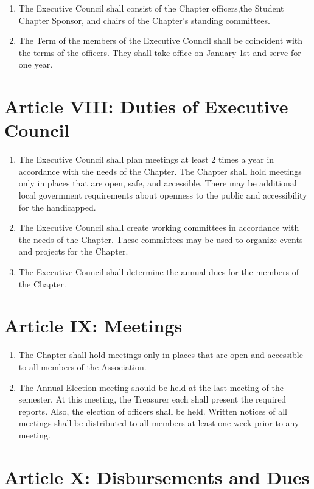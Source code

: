 \begin{enumerate}
	\item The Executive Council shall consist of the Chapter officers,the Student Chapter Sponsor, and chairs of the Chapter's standing committees.
	\item The Term of the members of the Executive Council shall be coincident with the terms of the officers. They shall take office on January 1st and serve for one year.
\end{enumerate}


\section*{Article VIII: Duties of Executive Council}

\begin{enumerate}
	\item The Executive Council shall plan meetings at least 2 times a year in accordance with the needs of the Chapter. The Chapter shall hold meetings only in places that are open, safe, and accessible. There may be additional local government requirements about openness to the public and accessibility for the handicapped.
	\item The Executive Council shall create working committees in accordance with the needs of the Chapter. These committees may be used to organize events and projects for the Chapter.
	\item The Executive Council shall determine the annual dues for the members of the Chapter.
\end{enumerate}

\section*{Article IX: Meetings}

\begin{enumerate}
	\item The Chapter shall hold meetings only in places that are open and accessible to all members of the Association.
	\item The Annual Election meeting should be held at the last meeting of the semester. At this meeting, the Treasurer each shall present the required reports. Also, the election of officers shall be held. Written notices of all meetings shall be distributed to all members at least one week prior to any meeting.
\end{enumerate}

\section*{Article X: Disbursements and Dues}

